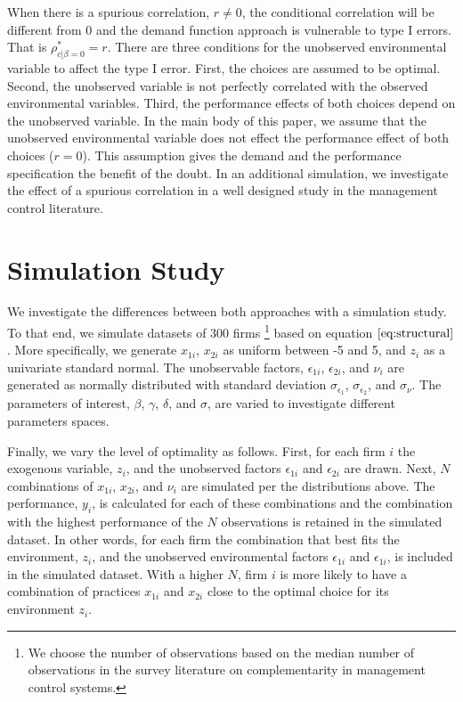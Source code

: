 \documentclass[12pt]{article}
\begin{document}
When there is a spurious correlation, \(r \neq 0\), the conditional
correlation will be different from 0 and the demand function approach is
vulnerable to type I errors. That is \(\rho^*_{c|\beta=0} = r\). There
are three conditions for the unobserved environmental variable to affect
the type I error. First, the choices are assumed to be optimal. Second,
the unobserved variable is not perfectly correlated with the observed
environmental variables. Third, the performance effects of both choices
depend on the unobserved variable. In the main body of this paper, we
assume that the unobserved environmental variable does not effect the
performance effect of both choices (\(r = 0\)). This assumption gives
the demand and the performance specification the benefit of the doubt.
In an additional simulation, we investigate the effect of a spurious
correlation in a well designed study in the management control
literature.

\section{Simulation Study}\label{simulation-study}

We investigate the differences between both approaches with a simulation
study. To that end, we simulate datasets of 300 firms \footnote{We
  choose the number of observations based on the median number of
  observations in the survey literature on complementarity in management
  control systems.} based on equation \(\eqref{eq:structural}\). More
specifically, we generate \(x_{1i}\), \(x_{2i}\) as uniform between -5
and 5, and \(z_i\) as a univariate standard normal. The unobservable
factors, \(\epsilon_{1i}\), \(\epsilon_{2i}\), and \(\nu_i\) are
generated as normally distributed with standard deviation
\(\sigma_{\epsilon_1}\), \(\sigma_{\epsilon_2}\), and \(\sigma_{\nu}\).
The parameters of interest, \(\beta\), \(\gamma\), \(\delta\), and
\(\sigma\), are varied to investigate different parameters spaces.

Finally, we vary the level of optimality as follows. First, for each
firm \(i\) the exogenous variable, \(z_i\), and the unobserved factors
\(\epsilon_{1i}\) and \(\epsilon_{2i}\) are drawn. Next, \(N\)
combinations of \(x_{1i}\), \(x_{2i}\), and \(\nu_i\) are simulated per
the distributions above. The performance, \(y_i\), is calculated for
each of these combinations and the combination with the highest
performance of the \(N\) observations is retained in the simulated
dataset. In other words, for each firm the combination that best fits
the environment, \(z_i\), and the unobserved environmental factors
\(\epsilon_{1i}\) and \(\epsilon_{1i}\), is included in the simulated
dataset. With a higher \(N\), firm \(i\) is more likely to have a
combination of practices \(x_{1i}\) and \(x_{2i}\) close to the optimal
choice for its environment \(z_i\).
\end{document}

